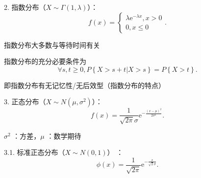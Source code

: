 2. 指数分布（$X\sim \Gamma\left( 1,\lambda \right) $）：\[
    f\left( x \right) =\begin{cases}
        \lambda\mathrm{e}^{-\lambda x},x>0\\
        0,x\le 0
    \end{cases}
.\] 
\begin{notation}
    指数分布大多数与等待时间有关

    指数分布的充分必要条件为\[
        \forall s,t\ge 0,P\left\{ X>s+t|X>s \right\} =P\left\{ X>t \right\} 
    .\] 

    即指数分布有无记忆性/无后效型（指数分布的特点）
\end{notation}

3. 正态分布（$X\sim N\left( \mu,\sigma^{2} \right) $）：\[
    f\left( x \right) =\frac{1}{\sqrt{2\pi} \sigma}\mathrm{e}^{-\frac{\left( x-\mu \right) ^{2}}{2\sigma^{2}}}
.\] 

\begin{notation}
    $\sigma^{2}$ ：方差，$\mu$ ：数学期待
\end{notation}

3.1. 标准正态分布（$X\sim N\left( 0,1 \right) $） ：\[
\phi\left( x \right) =\frac{1}{\sqrt{2\pi}} \mathrm{e}^{-\frac{x}{\sqrt{2} \sigma}}
.\] 
